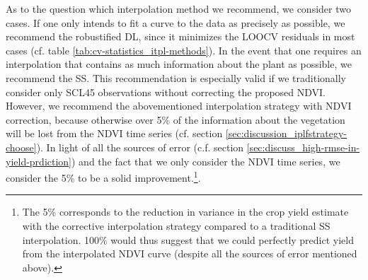 As to the question which interpolation method we recommend, we consider two cases. If one only intends to fit a curve to the data as precisely as possible, we recommend the robustified DL, since it minimizes the LOOCV residuals in most cases (cf. table \ref{tab:cv-statistics_itpl-methods}). In the event that one requires an interpolation that contains as much information about the plant as possible, we recommend the SS. This recommendation is especially valid if we traditionally consider only SCL45 observations without correcting the proposed NDVI. However, we recommend the abovementioned interpolation strategy with NDVI correction, because otherwise over 5\% of the information about the vegetation will be lost from the NDVI time series (cf. section \ref{sec:discussion_iplfstrategy-choose}). In light of all the sources of error (c.f. section \ref{sec:discuss_high-rmse-in-yield-prdiction}) and the fact that we only consider the NDVI time series, we consider the 5\% to be a solid improvement.\footnote{The 5\% corresponds to the reduction in variance in the crop yield estimate with the corrective interpolation strategy compared to a traditional SS interpolation. 100\% would thus suggest that we could perfectly predict yield from the interpolated NDVI curve (despite all the sources of error mentioned above).}.





